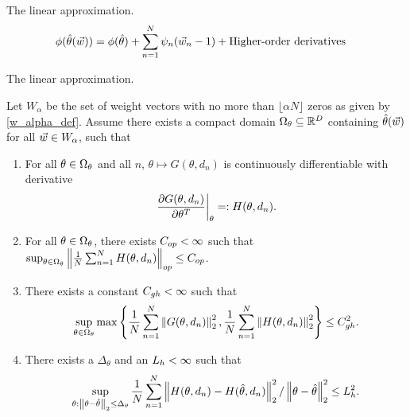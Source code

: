 \begin{frame}{The linear approximation.}
%
\begin{align*}
%
\thetafun(\thetahat(\w)) ={}&
\thetafun(\thetahat) + \sumn \infl_n (\w_n - 1) +
\textrm{Higher-order derivatives}
%
\end{align*}
%
\end{frame}





\begin{frame}{The linear approximation.}
%

\begin{assu}
%
Let $W_\alpha$ be the set of weight vectors with no more than $\lfloor \alpha N
\rfloor$ zeros as given by \eqref{w_alpha_def}.   Assume there exists a compact
domain $\Omega_\theta \subseteq \mathbb{R}^D$ containing $\hat{\theta}(\vec{w})$ for all $\vec{w}
\in W_\alpha$, such that
%
\begin{enumerate}
    \item For all $\theta \in \Omega_\theta$ and all $n$, $\theta \mapsto G(\theta,
    d_n)$ is continuously differentiable with derivative
    \begin{align*}
    \left.\frac{\partial G(\theta, d_n)}{\partial \theta^T}\right|_{\theta}
    =: H(\theta, d_n).
    \end{align*}
    \sloppy \item For all $\theta \in \Omega_\theta$, there exists $C_{op} < \infty$
    such that
    $\sup_{\theta \in \Omega_\theta}\left\Vert \frac{1}{N}\sum_{n=1}^N H(\theta, d_n)\right\Vert_{op} \le C_{op}$.
    \sloppy \item There exists a constant $C_{gh} < \infty$ such that
    \begin{align*}
    \sup_{\theta \in \Omega_\theta}
        \max\left\{\frac{1}{N}\sum_{n=1}^N \left\Vert G(\theta, d_n)\right\Vert_2^2,
              \frac{1}{N}\sum_{n=1}^N \left\Vert H(\theta, d_n)\right\Vert_2^2 \right\} \le C_{gh}^2.
    \end{align*}
    \item There exists a $\Delta_\theta$ and an $L_{h} < \infty$ such that
    \begin{align*}
    \sup_{\theta: \left\Vert \theta - \hat{\theta}\right\Vert_2 \le \Delta_\theta}
    \frac{1}{N}\sum_{n=1}^N \left\Vert H(\theta, d_n) - H(\hat{\theta}, d_n)\right\Vert_2^2 /
         \left\Vert \theta - \hat{\theta}\right\Vert_2^2
    \le L_{h}^2.
    \end{align*}
\end{enumerate}
%
\end{assu}
%
\end{frame}
